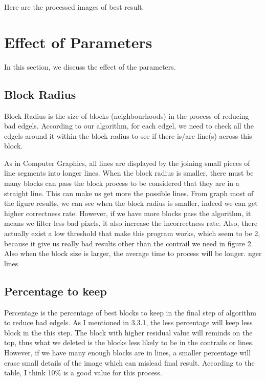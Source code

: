 Here are the processed images of best result.


\section{Effect of Parameters}

In this section, we discuss the effect of the parameters.

\subsection{Block Radius}
Block Radius is the size of blocks (neighbourhoods) in the process of 
reducing bad edgels. According to our algorithm, for each edgel, we need 
to check all the edgels around it within the block radius to see if there 
is/are line(s) across this block.

As in Computer Graphics, all lines are displayed by the joining small pieces 
of line segments into longer lines. When the block radius is smaller, 
there must be many blocks can pass the block process to be considered 
that they are in a straight line. This can make us get more the possible lines. From graph most of the figure results, we can see when the block radius is smaller, indeed we can get higher correctness rate. However, if we have more blocks pass the algorithm, it means we filter less bad pixels, it also increase the incorrectness rate. Also, there actually exist a low threshold that make this program works, which seem to be 2, because it give us really bad results other than the contrail we need in figure 2. Also when the block size is larger, the average time to process will be longer. 
nger lines

\subsection{Percentage to keep}

Percentage is the percentage of best blocks to keep in the final step of algorithm to reduce bad edgels. As I mentioned in 3.3.1, the less percentage will keep less block in the this step.
The block with higher residual value will reminds on the top, thus what we deleted is the blocks less likely to be in the contrails or lines. However, if we have many enough blocks are in lines, a smaller percentage will erase small details of the image which can mislead final result. According to the table, I think 10\% is a good value for this process.

